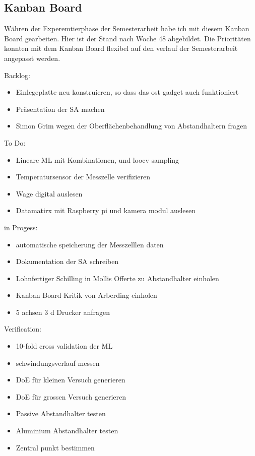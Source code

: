 \subsection{Kanban Board}
\label{KanbanBoard}
Währen der Experemtierphase der Semesterarbeit habe ich mit diesem Kanban Board gearbeiten. Hier ist der Stand nach Woche 48 abgebildet. Die Prioritäten konnten mit dem Kanban Board flexibel auf den verlauf der Semesterarbeit angepasst werden.

Backlog:
\begin{itemize}
\item Einlegeplatte neu konstruieren, so dass das ost gadget auch funktioniert
 \item Präsentation der SA machen
 \item Simon Grim wegen der Oberflächenbehandlung von Abstandhaltern fragen
  
\end{itemize}

To Do:
\begin{itemize}
\item Lineare ML mit Kombinationen, und loocv sampling
 \item Temperatursensor der Messzelle verifizieren
 \item Wage digital auslesen
 \item Datamatirx mit Raspberry pi und kamera modul auslesen
 
\end{itemize}

in Progess:
\begin{itemize}
\item automatische speicherung der Messzelllen daten
 \item Dokumentation der SA schreiben
 \item Lohnfertiger Schilling in Mollis Offerte zu Abstandhalter einholen
 \item Kanban Board Kritik von Arberding einholen
 \item 5 achsen 3 d Drucker anfragen

 
\end{itemize}

Verification:
\begin{itemize}
\item 10-fold cross validation der ML
 \item schwindungsverlauf messen
 \item DoE für kleinen Versuch generieren
 \item DoE für grossen Versuch generieren
 \item Passive Abstandhalter testen
 \item Aluminium Abstandhalter testen
   \item Zentral punkt bestimmen
\end{itemize}

